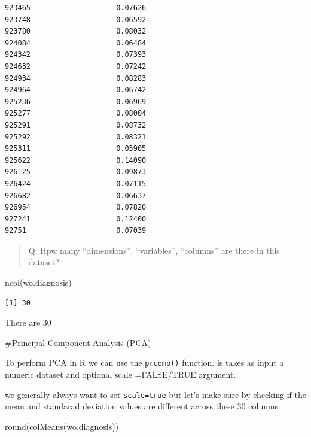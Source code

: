 \documentclass[
  letterpaper,
  DIV=11,
  numbers=noendperiod]{scrartcl}
\newenvironment{Shaded}{\begin{snugshade}}{\end{snugshade}}
\newcommand{\FunctionTok}[1]{\textcolor[rgb]{0.28,0.35,0.67}{#1}}
\newcommand{\NormalTok}[1]{\textcolor[rgb]{0.00,0.23,0.31}{#1}}
\begin{document}
\begin{verbatim}
923465                    0.07626
923748                    0.06592
923780                    0.08032
924084                    0.06484
924342                    0.07393
924632                    0.07242
924934                    0.08283
924964                    0.06742
925236                    0.06969
925277                    0.08004
925291                    0.08732
925292                    0.08321
925311                    0.05905
925622                    0.14090
926125                    0.09873
926424                    0.07115
926682                    0.06637
926954                    0.07820
927241                    0.12400
92751                     0.07039
\end{verbatim}

\begin{quote}
Q. Hpw many ``dimensions'', ``variables'', ``columns'' are there in this
dataset?
\end{quote}

\begin{Shaded}
\begin{Highlighting}[]
\FunctionTok{ncol}\NormalTok{(wo.diagnosis)}
\end{Highlighting}
\end{Shaded}

\begin{verbatim}
[1] 30
\end{verbatim}

There are 30

\#Principal Component Analysis (PCA)

To perform PCA in R we can use the \texttt{prcomp()} function. is takes
as input a numeric dataset and optional scale =FALSE/TRUE argument.

we generally always want to set \texttt{scale=true} but let's make sure
by checking if the mean and standarad deviation values are different
across these 30 columns

\begin{Shaded}
\begin{Highlighting}[]
\FunctionTok{round}\NormalTok{(}\FunctionTok{colMeans}\NormalTok{(wo.diagnosis))}
\end{Highlighting}
\end{Shaded}
\end{document}
